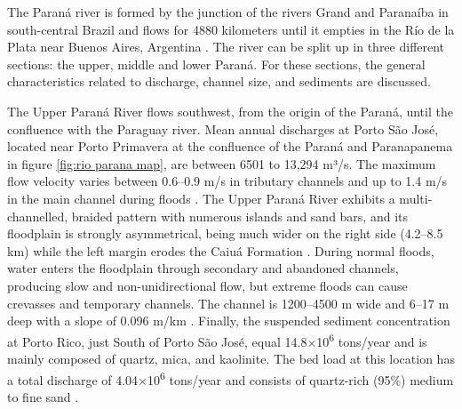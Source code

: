 
The Paraná river is formed by the junction of the rivers Grand and Paranaíba in south-central Brazil and flows for 4880 kilometers until it empties in the Río de la Plata near Buenos Aires, Argentina \autocite{orfeoHydraulicMorphologicalCharacteristics2002}. The river can be split up in three different sections: the upper, middle and lower Paraná. For these sections, the general characteristics related to discharge, channel size, and sediments are discussed.

The Upper Paraná River flows southwest, from the origin of the Paraná, until the confluence with the Paraguay river. Mean annual discharges at Porto São José, located near Porto Primavera at the confluence of the Paraná and Paranapanema in figure \ref{fig:rio parana map}, are between 6501 to 13,294 m³/s. The maximum flow velocity varies between 0.6–0.9 m/s in tributary channels and up to 1.4 m/s in the main channel during floods \autocite{stevauxUpperParanaRiver1994}. The Upper Paraná River exhibits a multi-channelled, braided pattern with numerous islands and sand bars, and its floodplain is strongly asymmetrical, being much wider on the right side (4.2–8.5 km) while the left margin erodes the Caiuá Formation \autocite{orfeoHydraulicMorphologicalCharacteristics2002}. During normal floods, water enters the floodplain through secondary and abandoned channels, producing slow and non-unidirectional flow, but extreme floods can cause crevasses and temporary channels. The channel is 1200–4500 m wide and 6–17 m deep with a slope of 0.096 m/km \autocite{stevauxUpperParanaRiver1994}. Finally, the suspended sediment concentration at Porto Rico, just South of Porto São José, equal 14.8×10\textsuperscript{6} tons/year and is mainly composed of quartz, mica, and kaolinite. The bed load at this location has a total discharge of 4.04×10\textsuperscript{6} tons/year and consists of quartz-rich (95\%) medium to fine sand \autocite{stevauxUpperParanaRiver1994}.

